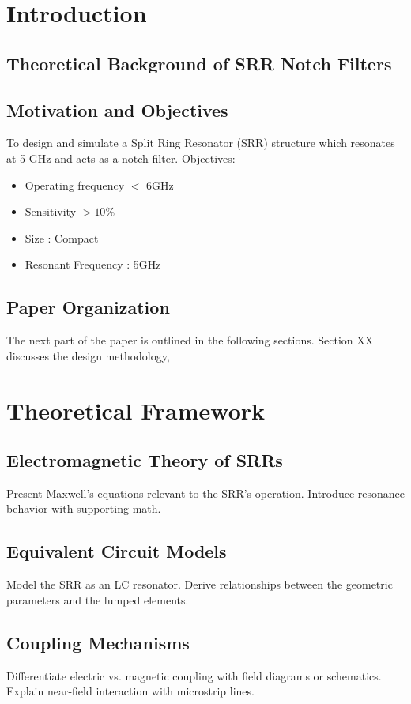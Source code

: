 \documentclass[conference]{IEEEtran}
\begin{document}
\section{Introduction}


\subsection{Theoretical Background of SRR Notch Filters}

\subsection{Motivation and Objectives}
To design and simulate a Split Ring Resonator (SRR) structure which resonates at 5 GHz and acts as a notch filter. 
Objectives: 
\begin{itemize}
    \item Operating frequency $ <$ 6GHz
    \item Sensitivity  $ > 10 $\%
    \item Size : Compact
    \item Resonant Frequency : 5GHz
\end{itemize}

\subsection{Paper Organization}
The next part of the paper is outlined in the following sections. Section XX discusses the design methodology, 

\section{Theoretical Framework}

\subsection{Electromagnetic Theory of SRRs}
Present Maxwell’s equations relevant to the SRR’s operation. Introduce resonance behavior with supporting math.

\subsection{Equivalent Circuit Models}
Model the SRR as an LC resonator. Derive relationships between the geometric parameters and the lumped elements.

\subsection{Coupling Mechanisms}
Differentiate electric vs. magnetic coupling with field diagrams or schematics. Explain near-field interaction with microstrip lines.
\end{document}
